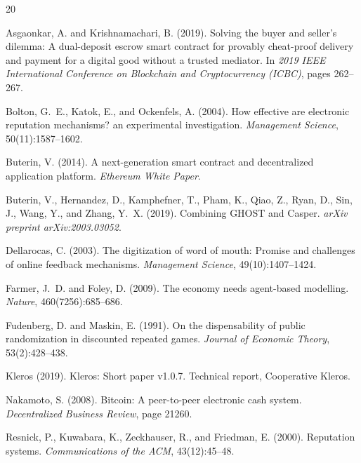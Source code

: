 \documentclass[11pt,a4paper]{article}
\begin{document}

\begin{thebibliography}{20}

Asgaonkar, A. and Krishnamachari, B. (2019).
\newblock Solving the buyer and seller's dilemma: A dual-deposit escrow smart contract for provably cheat-proof delivery and payment for a digital good without a trusted mediator.
\newblock In \emph{2019 IEEE International Conference on Blockchain and Cryptocurrency (ICBC)}, pages 262--267.

Bolton, G.~E., Katok, E., and Ockenfels, A. (2004).
\newblock How effective are electronic reputation mechanisms? an experimental investigation.
\newblock \emph{Management Science}, 50(11):1587--1602.

Buterin, V. (2014).
\newblock A next-generation smart contract and decentralized application platform.
\newblock \emph{Ethereum White Paper}.

Buterin, V., Hernandez, D., Kamphefner, T., Pham, K., Qiao, Z., Ryan, D., Sin, J., Wang, Y., and Zhang, Y.~X. (2019).
\newblock Combining GHOST and Casper.
\newblock \emph{arXiv preprint arXiv:2003.03052}.

Dellarocas, C. (2003).
\newblock The digitization of word of mouth: Promise and challenges of online feedback mechanisms.
\newblock \emph{Management Science}, 49(10):1407--1424.

Farmer, J.~D. and Foley, D. (2009).
\newblock The economy needs agent-based modelling.
\newblock \emph{Nature}, 460(7256):685--686.

Fudenberg, D. and Maskin, E. (1991).
\newblock On the dispensability of public randomization in discounted repeated games.
\newblock \emph{Journal of Economic Theory}, 53(2):428--438.

Kleros (2019).
\newblock Kleros: Short paper v1.0.7.
\newblock Technical report, Cooperative Kleros.

Nakamoto, S. (2008).
\newblock Bitcoin: A peer-to-peer electronic cash system.
\newblock \emph{Decentralized Business Review}, page 21260.

Resnick, P., Kuwabara, K., Zeckhauser, R., and Friedman, E. (2000).
\newblock Reputation systems.
\newblock \emph{Communications of the ACM}, 43(12):45--48.


\end{thebibliography}
\end{document}

